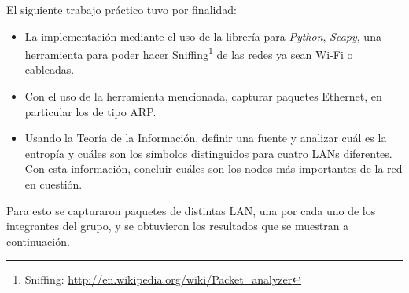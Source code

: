 \indent El siguiente trabajo práctico tuvo por finalidad:
\begin{itemize}
	\item La implementación mediante el uso de la librería para \textit{Python}, \textit{Scapy}, una herramienta para poder hacer Sniffing\footnote{Sniffing: \url{http://en.wikipedia.org/wiki/Packet_analyzer}} de las redes ya sean Wi-Fi o cableadas.
    \item Con el uso de la herramienta mencionada, capturar paquetes Ethernet, en particular los de tipo ARP.
    \item Usando la Teoría de la Información, definir una fuente y analizar cuál es la entropía y cuáles son los símbolos distinguidos para cuatro LANs diferentes. Con esta información, concluir cuáles son los nodos más importantes de la red en cuestión.
\end{itemize}

Para esto se capturaron paquetes de distintas LAN, una por cada uno de los integrantes del grupo, y se obtuvieron los resultados que se muestran a continuación.


